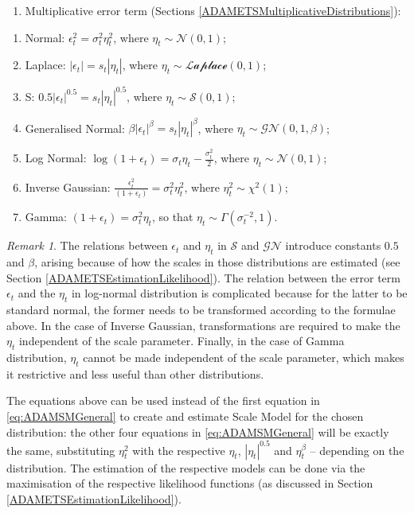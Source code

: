 \documentclass[
]{book}
\providecommand{\tightlist}{%
  \setlength{\itemsep}{0pt}\setlength{\parskip}{0pt}}
\theoremstyle{definition}
\theoremstyle{definition}
\theoremstyle{definition}
\theoremstyle{definition}
\theoremstyle{remark}
\newtheorem*{remark}{Remark}
\begin{document}
\begin{enumerate}
\def\labelenumi{\arabic{enumi}.}
\setcounter{enumi}{1}
\tightlist
\item
  Multiplicative error term (Sections \ref{ADAMETSMultiplicativeDistributions}):
\end{enumerate}

\begin{enumerate}
\def\labelenumi{\alph{enumi}.}
\tightlist
\item
  Normal: \(\epsilon_t^2 = \sigma_t^2 \eta_t^2\), where \(\eta_t \sim \mathcal{N}(0, 1)\);
\item
  Laplace: \(|\epsilon_t| = s_t |\eta_t|\), where \(\eta_t \sim \mathcal{Laplace}(0, 1)\);
\item
  S: \(0.5 |\epsilon_t|^{0.5} = s_t |\eta_t|^{0.5}\), where \(\eta_t \sim \mathcal{S}(0, 1)\);
\item
  Generalised Normal: \(\beta |\epsilon_t|^{\beta} = s_t |\eta_t|^{\beta}\), where \(\eta_t \sim \mathcal{GN}(0, 1, \beta)\);
\item
  Log Normal: \(\log\left(1+\epsilon_t \right) = \sigma_t \eta_t -\frac{\sigma_t^2}{2}\), where \(\eta_t \sim \mathcal{N}(0, 1)\);
\item
  Inverse Gaussian: \(\frac{\epsilon_t ^2}{\left(1+\epsilon_t \right)}=\sigma^2_t \eta_t^2\), where \(\eta_t^2 \sim \chi^2(1)\);
\item
  Gamma: \(\left(1+\epsilon_t \right) = \sigma_t^2 \eta_t\), so that \(\eta_t \sim \mathcal{\Gamma}(\sigma_t^{-2}, 1)\).
\end{enumerate}

\begin{remark}
The relations between \(\epsilon_t\) and \(\eta_t\) in \(\mathcal{S}\) and \(\mathcal{GN}\) introduce constants \(0.5\) and \(\beta\), arising because of how the scales in those distributions are estimated (see Section \ref{ADAMETSEstimationLikelihood}). The relation between the error term \(\epsilon_t\) and the \(\eta_t\) in log-normal distribution is complicated because for the latter to be standard normal, the former needs to be transformed according to the formulae above. In the case of Inverse Gaussian, transformations are required to make the \(\eta_t\) independent of the scale parameter. Finally, in the case of Gamma distribution, \(\eta_t\) cannot be made independent of the scale parameter, which makes it restrictive and less useful than other distributions.
\end{remark}

The equations above can be used instead of the first equation in \eqref{eq:ADAMSMGeneral} to create and estimate Scale Model for the chosen distribution: the other four equations in \eqref{eq:ADAMSMGeneral} will be exactly the same, substituting \(\eta_t^2\) with the respective \(\eta_t\), \(|\eta_t|^{0.5}\) and \(\eta_t^{\beta}\) -- depending on the distribution. The estimation of the respective models can be done via the maximisation of the respective likelihood functions (as discussed in Section \ref{ADAMETSEstimationLikelihood}).
\end{document}
